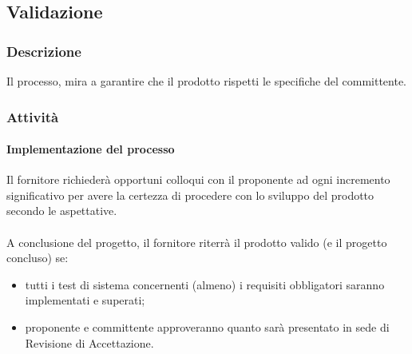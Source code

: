 \subsection{Validazione}
    \subsubsection{Descrizione}
    Il processo, mira a garantire che il prodotto rispetti le specifiche del committente.

    \subsubsection{Attività}
        \paragraph{Implementazione del processo}
        Il fornitore richiederà opportuni colloqui con il proponente ad ogni incremento significativo per avere la certezza di procedere con lo sviluppo del prodotto secondo le aspettative.
        \\\\
        A conclusione del progetto, il fornitore riterrà il prodotto valido (e il progetto concluso) se:
        \begin{itemize}
            \item tutti i test di sistema concernenti (almeno) i requisiti obbligatori saranno implementati e superati;
            \item proponente e committente approveranno quanto sarà presentato in sede di Revisione di Accettazione.
        \end{itemize}